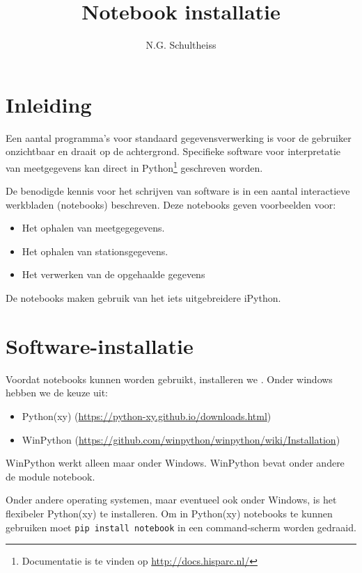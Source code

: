 

\title{Notebook installatie}
\author{N.G. Schultheiss}



\maketitle

\section{Inleiding}

Een aantal programma's voor standaard \hisparc gegevensverwerking is voor de gebruiker onzichtbaar
en draait op de achtergrond. Specifieke software voor interpretatie van meetgegevens kan direct in
Python\footnote{Documentatie is te vinden op \url{http://docs.hisparc.nl/}} geschreven worden.

De benodigde kennis voor het schrijven van \python software is in een aantal interactieve werkbladen
 (notebooks) beschreven. Deze notebooks geven voorbeelden voor:
\begin{itemize}
\item Het ophalen van meetgegegevens.
\item Het ophalen van stationsgegevens.
\item Het verwerken van de opgehaalde gegevens
\end{itemize}
De notebooks maken gebruik van het iets uitgebreidere iPython.

\section{Software-installatie}

Voordat notebooks kunnen worden gebruikt, installeren we . Onder windows hebben we de keuze uit:
\begin{itemize}
\item Python(xy) (\url{https://python-xy.github.io/downloads.html})
\item WinPython (\url{https://github.com/winpython/winpython/wiki/Installation})
\end{itemize}

WinPython werkt alleen maar onder Windows. WinPython bevat onder andere de module notebook.

Onder andere operating systemen, maar eventueel ook onder Windows, is het flexibeler Python(xy) te installeren.
Om in Python(xy) notebooks te kunnen gebruiken moet {\tt pip install notebook} in een command-scherm worden
gedraaid.

